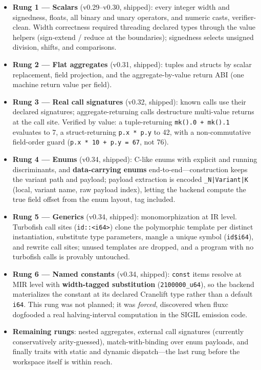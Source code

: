 \begin{itemize}
\item \textbf{Rung 1 --- Scalars} (v0.29--v0.30, shipped): every integer width and signedness, floats, all binary and unary operators, and numeric casts, verifier-clean. Width correctness required threading declared types through the value helpers (sign-extend / reduce at the boundaries); signedness selects unsigned division, shifts, and comparisons.
\item \textbf{Rung 2 --- Flat aggregates} (v0.31, shipped): tuples and structs by scalar replacement, field projection, and the aggregate-by-value return ABI (one machine return value per field).
\item \textbf{Rung 3 --- Real call signatures} (v0.32, shipped): known calls use their declared signatures; aggregate-returning calls destructure multi-value returns at the call site. Verified by value: a tuple-returning \texttt{mk().0 + mk().1} evaluates to 7, a struct-returning \texttt{p.x * p.y} to 42, with a non-commutative field-order guard (\texttt{p.x * 10 + p.y = 67}, not 76).
\item \textbf{Rung 4 --- Enums} (v0.34, shipped): C-like enums with explicit and running discriminants, and \textbf{data-carrying enums} end-to-end---construction keeps the variant path and payload; payload extraction is encoded \texttt{\_N|Variant|K} (local, variant name, raw payload index), letting the backend compute the true field offset from the enum layout, tag included.
\item \textbf{Rung 5 --- Generics} (v0.34, shipped): monomorphization at IR level. Turbofish call sites (\texttt{id::<i64>}) clone the polymorphic template per distinct instantiation, substitute type parameters, mangle a unique symbol (\texttt{id\$i64}), and rewrite call sites; unused templates are dropped, and a program with no turbofish calls is provably untouched.
\item \textbf{Rung 6 --- Named constants} (v0.34, shipped): \texttt{const} items resolve at MIR level with \textbf{width-tagged substitution} (\texttt{2100000\_u64}), so the backend materializes the constant at its declared Cranelift type rather than a default \texttt{i64}. This rung was not planned; it was \emph{forced}, discovered when fluxc dogfooded a real halving-interval computation in the SIGIL emission code.
\item \textbf{Remaining rungs}: nested aggregates, external call signatures (currently conservatively arity-guessed), match-with-binding over enum payloads, and finally traits with static and dynamic dispatch---the last rung before the workspace itself is within reach.
\end{itemize}

